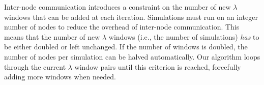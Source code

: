 Inter-node communication introduces a constraint on the number of new $\lambda$
windows that can be added at each iteration. Simulations must run on an
integer number of nodes to reduce the overhead of inter-node communication.
This means that the number of new $\lambda$ windows (i.e., the number of
simulations) \emph{has} to be either doubled or left unchanged. If the number
of windows is doubled, the number of nodes per simulation can be halved
automatically. Our algorithm loops through the current $\lambda$ window pairs
until this criterion is reached, forcefully adding more windows when needed.






